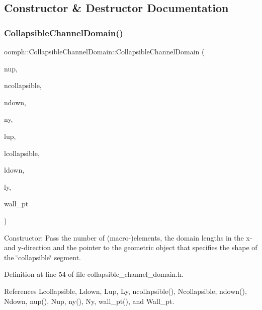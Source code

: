\subsection{Constructor \& Destructor Documentation}
\mbox{\label{classoomph_1_1CollapsibleChannelDomain_a85e64b812b36155302407269d77dc6b3}} 
\subsubsection{\texorpdfstring{Collapsible\+Channel\+Domain()}{CollapsibleChannelDomain()}}
{\footnotesize\ttfamily oomph\+::\+Collapsible\+Channel\+Domain\+::\+Collapsible\+Channel\+Domain (\begin{DoxyParamCaption}\item[{const unsigned \&}]{nup,  }\item[{const unsigned \&}]{ncollapsible,  }\item[{const unsigned \&}]{ndown,  }\item[{const unsigned \&}]{ny,  }\item[{const double \&}]{lup,  }\item[{const double \&}]{lcollapsible,  }\item[{const double \&}]{ldown,  }\item[{const double \&}]{ly,  }\item[{Geom\+Object $\ast$}]{wall\+\_\+pt }\end{DoxyParamCaption})\hspace{0.3cm}{\ttfamily [inline]}}



Constructor\+: Pass the number of (macro-\/)elements, the domain lengths in the x-\/ and y-\/direction and the pointer to the geometric object that specifies the shape of the \char`\"{}collapsible\char`\"{} segment. 



Definition at line 54 of file collapsible\+\_\+channel\+\_\+domain.\+h.



References Lcollapsible, Ldown, Lup, Ly, ncollapsible(), Ncollapsible, ndown(), Ndown, nup(), Nup, ny(), Ny, wall\+\_\+pt(), and Wall\+\_\+pt.

